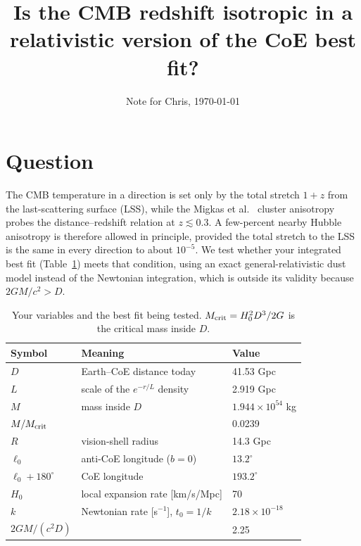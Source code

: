 \documentclass[10pt,twocolumn,letterpaper]{article}
\title{\vspace{-0.6in}\Large Is the CMB redshift isotropic in a relativistic version of the CoE best fit?}
\author{Note for Chris, \today}
\date{\vspace{-0.35in}}
\begin{document}
\maketitle

\section{Question}
The CMB temperature in a direction is set only by the total stretch $1+z$ from the last-scattering surface (LSS), while the Migkas et al.\ \cite{Migkas2020} cluster anisotropy probes the distance--redshift relation at $z\lesssim0.3$. A few-percent nearby Hubble anisotropy is therefore allowed in principle, provided the total stretch to the LSS is the same in every direction to about $10^{-5}$. We test whether your integrated best fit (Table~\ref{tab:vars}) meets that condition, using an exact general-relativistic dust model instead of the Newtonian integration, which is outside its validity because $2GM/c^2>D$.

\begin{table}[h]\centering\footnotesize
\caption{Your variables and the best fit being tested. $M_{\rm crit}=H_0^2D^3/2G$ is the critical mass inside $D$.}\label{tab:vars}
\begin{tabular}{@{}lll@{}}\toprule
Symbol & Meaning & Value\\\midrule
$D$ & Earth--CoE distance today & 41.53 Gpc\\
$L$ & scale of the $e^{-r/L}$ density & 2.919 Gpc\\
$M$ & mass inside $D$ & $1.944\times10^{54}$ kg\\
$M/M_{\rm crit}$ & & 0.0239\\
$R$ & vision-shell radius & 14.3 Gpc\\
$\ell_0$ & anti-CoE longitude ($b=0$) & $13.2^\circ$\\
$\ell_0+180^\circ$ & CoE longitude & $193.2^\circ$\\
$H_0$ & local expansion rate [km/s/Mpc] & 70\\
$k$ & Newtonian rate [s$^{-1}$], $t_0=1/k$ & $2.18\times10^{-18}$\\
$2GM/(c^2D)$ & & 2.25\\\bottomrule
\end{tabular}\end{table}
\end{document}
